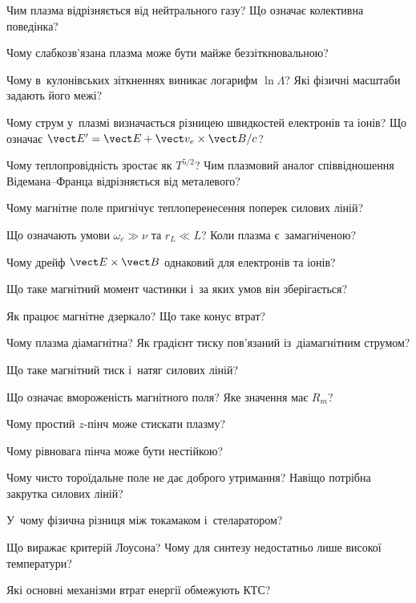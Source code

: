 \begin{Questions}
	\begin{quizlist}
		\item Чим плазма відрізняється від нейтрального газу? Що означає колективна поведінка?
		\item Чому слабкозв'язана плазма може бути майже беззіткнювальною?
		\item Чому в~кулонівських зіткненнях виникає логарифм $\ln\Lambda$? Які фізичні масштаби
		задають його межі?
		\item Чому струм у~плазмі визначається різницею швидкостей електронів та іонів? Що
		означає $\vect E'=\vect E+\vect v_e\times\vect B/c$?
		\item Чому теплопровідність зростає як $T^{5/2}$? Чим плазмовий аналог співвідношення
		Відемана--Франца відрізняється від металевого?
		\item Чому магнітне поле пригнічує теплоперенесення поперек силових ліній?
		\item Що означають умови $\omega_c\gg\nu$ та $r_L\ll L$? Коли плазма є~замагніченою?
		\item Чому дрейф $\vect E\times\vect B$ однаковий для електронів та іонів?
		\item Що таке магнітний момент частинки і~за яких умов він зберігається?
		\item Як працює магнітне дзеркало? Що таке конус втрат?
		\item Чому плазма діамагнітна? Як градієнт тиску пов'язаний із~діамагнітним струмом?
		\item Що таке магнітний тиск і~натяг силових ліній?
		\item Що означає вмороженість магнітного поля? Яке значення має $R_m$?
		\item Чому простий $z$-пінч може стискати плазму?
		\item Чому рівновага пінча може бути нестійкою?
		\item Чому чисто тороїдальне поле не дає доброго утримання? Навіщо потрібна закрутка
		силових ліній?
		\item У~чому фізична різниця між токамаком і~стеларатором?
		\item Що виражає критерій Лоусона? Чому для синтезу недостатньо лише високої температури?
		\item Які основні механізми втрат енергії обмежують КТС?
	\end{quizlist}
\end{Questions}